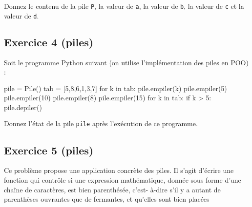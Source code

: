 \documentclass[
  a4paper,
  DIV=11,
  numbers=noendperiod]{scrartcl}
\newenvironment{Shaded}{\begin{snugshade}}{\end{snugshade}}
\newcommand{\ControlFlowTok}[1]{\textcolor[rgb]{0.00,0.23,0.31}{#1}}
\newcommand{\DecValTok}[1]{\textcolor[rgb]{0.68,0.00,0.00}{#1}}
\newcommand{\KeywordTok}[1]{\textcolor[rgb]{0.00,0.23,0.31}{#1}}
\newcommand{\NormalTok}[1]{\textcolor[rgb]{0.00,0.23,0.31}{#1}}
\newcommand{\OperatorTok}[1]{\textcolor[rgb]{0.37,0.37,0.37}{#1}}
\begin{document}
Donnez le contenu de la pile \texttt{P}, la valeur de \texttt{a}, la
valeur de \texttt{b}, la valeur de \texttt{c} et la valeur de
\texttt{d}.

\hypertarget{fa-solid-pencil-alt-exercice-4-piles}{%
\subsection{\texorpdfstring{ Exercice 4
(piles)}{ Exercice 4 (piles)}}\label{fa-solid-pencil-alt-exercice-4-piles}}

Soit le programme Python suivant (on utilise l'implémentation des piles
en POO) :

\begin{Shaded}
\begin{Highlighting}[]
\NormalTok{pile }\OperatorTok{=}\NormalTok{ Pile()}
\NormalTok{tab }\OperatorTok{=}\NormalTok{ [}\DecValTok{5}\NormalTok{,}\DecValTok{8}\NormalTok{,}\DecValTok{6}\NormalTok{,}\DecValTok{1}\NormalTok{,}\DecValTok{3}\NormalTok{,}\DecValTok{7}\NormalTok{]}
\ControlFlowTok{for}\NormalTok{ k }\KeywordTok{in}\NormalTok{ tab:}
\NormalTok{    pile.empiler(k)}
\NormalTok{pile.empiler(}\DecValTok{5}\NormalTok{)}
\NormalTok{pile.empiler(}\DecValTok{10}\NormalTok{)}
\NormalTok{pile.empiler(}\DecValTok{8}\NormalTok{)}
\NormalTok{pile.empiler(}\DecValTok{15}\NormalTok{)}
\ControlFlowTok{for}\NormalTok{ k }\KeywordTok{in}\NormalTok{ tab:}
    \ControlFlowTok{if}\NormalTok{ k }\OperatorTok{\textgreater{}} \DecValTok{5}\NormalTok{:}
\NormalTok{        pile.depiler()}
\end{Highlighting}
\end{Shaded}

Donnez l'état de la pile \texttt{pile} après l'exécution de ce
programme.

\hypertarget{fa-solid-pencil-alt-fa-desktop-exercice-5-piles}{%
\subsection{\texorpdfstring{ 
Exercice 5
(piles)}{  Exercice 5 (piles)}}\label{fa-solid-pencil-alt-fa-desktop-exercice-5-piles}}

Ce problème propose une application concrète des piles. Il s'agit
d'écrire une fonction qui contrôle si une expression mathématique,
donnée sous forme d'une chaîne de caractères, est bien parenthésée,
c'est- à-dire s'il y a autant de parenthèses ouvrantes que de fermantes,
et qu'elles sont bien placées
\end{document}
